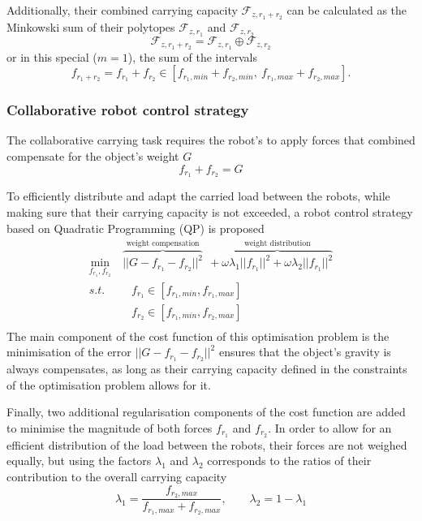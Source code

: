 Additionally, their combined carrying capacity $\mathcal{F}_{z,r_1+r_2}$ can be calculated as the Minkowski sum of their polytopes $\mathcal{F}_{z,r_1}$ and $\mathcal{F}_{z,r_2}$ 
$$\mathcal{F}_{z,r_1+r_2} = \mathcal{F}_{z,r_1}\oplus \mathcal{F}_{z,r_2}$$
or in this special ($m=1$), the sum of the intervals 
$$f_{r_1+r_2} = f_{r_1}+f_{r_2} \in  [f_{r_1,min} + f_{r_2,min}, ~f_{r_1,max} + f_{r_2,max}].$$


\subsubsection{Collaborative robot control strategy}
\label{sec:collab_robot_control_double_robot}
The collaborative carrying task requires the robot's to apply forces that combined compensate for the object's weight $G$ 
$$f_{r_1} + f_{r_2} = G$$

To efficiently distribute and adapt the carried load between the robots, while making sure that their carrying capacity is not exceeded, a robot control strategy based on Quadratic Programming (QP) is proposed
\begin{equation}
\begin{split}
    \min_{f_{r_1},f_{r_2}} &~\overbrace{||G - f_{r_1} -f_{r_2}||^2}^{\text{weight compensation}} ~~+ \overbrace{\omega \lambda_1||f_{r_1}||^2 + \omega \lambda_2||f_{r_1}||^2}^{\text{weight distribution}}\\
    s.t.& \quad f_{r_1} \in[f_{r_1,min}, f_{r_1,max}]\\
    & \quad f_{r_2} \in[f_{r_1,min}, f_{r_2,max}]\\
\end{split}
\label{eq:qp_robot_robot}
\end{equation}
The main component of the cost function of this optimisation problem is the minimisation of the error $||G - f_{r_1} -f_{r_2}||^2$ ensures that the object's gravity is always compensates, as long as their carrying capacity defined in the constraints of the optimisation problem allows for it. 

Finally, two additional regularisation components of the cost function are added to minimise the magnitude of both forces $f_{r_1}$ and $f_{r_2}$. In order to allow for an efficient distribution of the load between the robots, their forces are not weighed equally, but using the factors $\lambda_1$ and $\lambda_2$ corresponds to the ratios of their contribution to the overall carrying capacity 
\begin{equation}
\lambda_1 = \frac{f_{r_2,max}}{f_{r_1,max} + f_{r_2,max}}, \qquad \lambda_2 = 1- \lambda_1
\end{equation}

